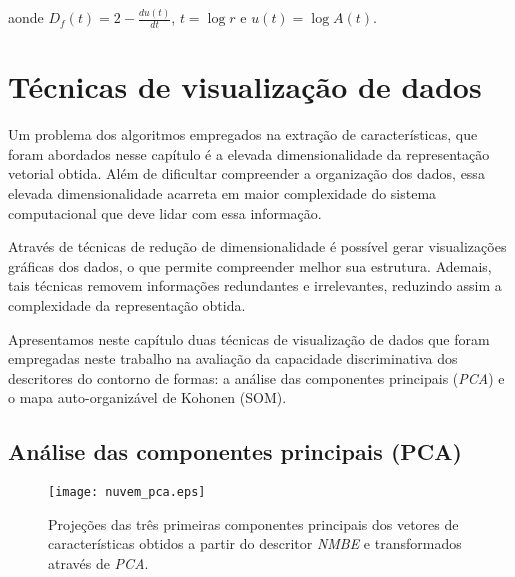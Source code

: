 \noindent aonde  $D_f(t) = 2 - \frac{du(t)}{dt}$, $t = \log{r}$ e $u(t) = \log{A(t)}$.


\section{Técnicas de visualização de dados}

Um problema dos algoritmos empregados na extração de características, que foram abordados nesse capítulo é a elevada dimensionalidade da representação vetorial obtida. Além de dificultar compreender a organização dos dados, essa elevada dimensionalidade acarreta em maior complexidade do sistema computacional que deve lidar com essa informação. 

Através de técnicas de redução de dimensionalidade é possível gerar visualizações gráficas dos dados, o que permite compreender melhor sua estrutura. Ademais, tais técnicas removem informações redundantes e irrelevantes, reduzindo assim a complexidade da representação obtida.

Apresentamos neste capítulo duas técnicas de visualização de dados que foram empregadas neste trabalho na avaliação da capacidade discriminativa dos descritores do contorno de formas: a análise das componentes principais (\emph{PCA}) e o mapa auto-organizável de Kohonen (SOM).



\subsection{Análise das componentes principais (PCA)}

\begin{figure}[h!]
  \caption{\label{fig:nuvem_pca} Projeções das três primeiras componentes principais dos vetores de características obtidos  a partir do descritor \emph{NMBE} e transformados através de \emph{PCA}.}
  \centering
  \texttt{[image: nuvem\_pca.eps]}
\end{figure}

